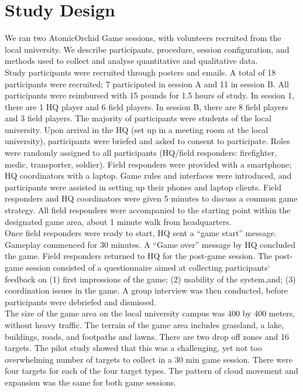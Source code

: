\section{Study Design}
We ran two AtomicOrchid Game sessions, with volunteers recruited from the local university. We describe participants, procedure, session configuration, and methods used to collect and analyse quantitative and qualitative data.\\

Study participants were recruited through posters and emails. A total of 18 participants were recruited; 7 participated in session A and 11 in session B. All participants were reimbursed with 15 pounds for 1.5 hours of study. In session 1, there are 1 HQ player and 6 field players. In session B, there are 8 field players and 3 field players. The majority of participants were students of the local university. Upon arrival in the HQ (set up in a meeting room at the local university), participants were briefed and asked to consent to participate. Roles were randomly assigned to all participants (HQ/field responders: firefighter, medic, transporter, soldier). Field responders were provided with a smartphone; HQ coordinators with a laptop. Game rules and interfaces were introduced, and participants were assisted in setting up their phones and laptop clients. Field responders and HQ coordinators were given 5 minutes to discuss a common game strategy. All field responders were accompanied to the starting point within the designated game area, about 1 minute walk from headquarters.\\

Once field responders were ready to start, HQ sent a ``game start'' message. Gameplay commenced for 30 minutes. A ``Game over'' message by HQ concluded the game. Field responders returned to HQ for the post-game session. The post-game session consisted of a questionnaire aimed at collecting participants` feedback on (1) first impressions of the game; (2) usability of the system,and; (3) coordination issues in the game. A group interview was then conducted, before participants were debriefed and dismissed.\\

The size of the game area on the local university campus was 400 by 400 meters, without heavy traffic. The terrain of the game area includes grassland, a lake, buildings, roads, and footpaths and lawns. There are two drop off zones and 16 targets. The pilot study showed that this was a challenging, yet not too overwhelming number of targets to collect in a 30 min game session. There were four targets for each of the four target types. The pattern of cloud movement and expansion was the same for both game sessions.\\

